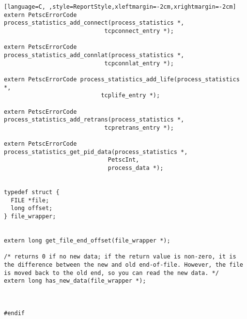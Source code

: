 \documentclass[11pt]{article}
\begin{document}
\begin{lstlisting}[language=C, ,style=ReportStyle,xleftmargin=-2cm,xrightmargin=-2cm]
extern PetscErrorCode process_statistics_add_connect(process_statistics *,
						     tcpconnect_entry *);

extern PetscErrorCode process_statistics_add_connlat(process_statistics *,
						     tcpconnlat_entry *);

extern PetscErrorCode process_statistics_add_life(process_statistics *,
						    tcplife_entry *);

extern PetscErrorCode process_statistics_add_retrans(process_statistics *,
						     tcpretrans_entry *);

extern PetscErrorCode process_statistics_get_pid_data(process_statistics *,
						      PetscInt,
						      process_data *);
						      

typedef struct {
  FILE *file;
  long offset;
} file_wrapper;


extern long get_file_end_offset(file_wrapper *);

/* returns 0 if no new data; if the return value is non-zero, it is the difference between the new and old end-of-file. However, the file is moved back to the old end, so you can read the new data. */
extern long has_new_data(file_wrapper *);



#endif
\end{lstlisting}
\end{document}
